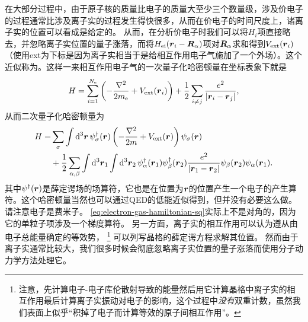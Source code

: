 在大部分过程中，由于原子核的质量比电子的质量大至少三个数量级，涉及价电子的过程通常比涉及离子实的过程发生得快很多，从而在价电子的时间尺度上，诸离子实的位置可以看成是给定的。
从而，在分析价电子时我们可以将${H}_i$项直接略去，并忽略离子实位置的量子涨落，而将${H}_\text{ei}(\vb*{r}_i-\vb*{R}_\alpha)$项对$\vb*{R}_\alpha$求和得到$V_\text{ext}(\vb*{r}_i)$（使用ext为下标是因为离子实相当于是给相互作用电子气施加了一个外场）。这个近似称为。这样一来相互作用电子气的一次量子化哈密顿量在坐标表象下就是
\begin{equation}
    {H} = \sum_{i=1}^{N_\text{e}} \left( - \frac{\laplacian}{2m_\text{e}} + V_\text{ext}(\vb*{r}_i)\right) + \frac{1}{2} \sum_{i\neq j} \frac{e^2}{\abs{\vb*{r}_i - \vb*{r}_j}},
    \label{eq:electron-gas-hamiltonian}
\end{equation}
从而二次量子化哈密顿量为
\begin{equation}
    \begin{aligned}
        {H} = &\sum_{\sigma} \int \dd[3]{\vb*{r}} {\psi}_\sigma^\dagger(\vb*{r}) \left( - \frac{\laplacian}{2m} + V_\text{ext}(\vb*{r}) \right) {\psi}_\sigma(\vb*{r}) \\
        &+ \frac{1}{2} \sum_{\alpha, \beta} \int \dd[3]{\vb*{r}_1} \int \dd[3]{\vb*{r}_2} 
        {\psi}_\alpha^\dagger (\vb*{r}_1) {\psi}_\beta^\dagger (\vb*{r}_2) \frac{e^2}{\abs{\vb*{r}_1 - \vb*{r}_2}} {\psi}_\beta (\vb*{r}_2) {\psi}_\alpha (\vb*{r}_1). 
    \end{aligned}
    \label{eq:electron-gas-hamiltonian-sq}
\end{equation}
其中${\psi}^\dagger(\vb*{r})$是薛定谔场的场算符，它也是在位置为$\vb*{r}$的位置产生一个电子的产生算符。这个哈密顿量当然也可以通过QED的低能近似得到，但并没有必要这么做。请注意电子是费米子。
\eqref{eq:electron-gas-hamiltonian-sq}实际上不是对角的，因为它的单粒子项涉及一个梯度算符。
另一方面，离子实的相互作用可以认为遵从由电子总能量确定的等效势，%
\footnote{
    注意，先计算电子-电子库伦散射导致的能量然后用它计算晶格中离子实的相互作用最后计算离子实振动对电子的影响，这个过程中\emph{没有}双重计数，虽然我们表面上似乎“积掉了电子而计算等效的原子间相互作用”。
}%
可以列写晶格的薛定谔方程求解其位置。
然而由于离子实通常比较大，我们很多时候会彻底忽略离子实位置的量子涨落而使用分子动力学方法处理它。

